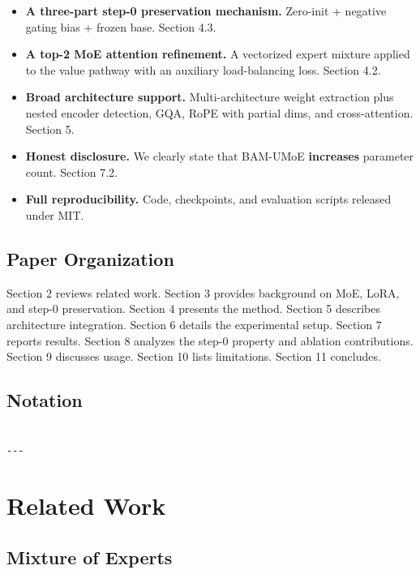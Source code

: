 \begin{itemize}
\item \textbf{A three-part step-0 preservation mechanism.} Zero-init + negative
  gating bias + frozen base. Section 4.3.
\item \textbf{A top-2 MoE attention refinement.} A vectorized expert mixture applied
  to the value pathway with an auxiliary load-balancing loss. Section 4.2.
\item \textbf{Broad architecture support.} Multi-architecture weight extraction plus
  nested encoder detection, GQA, RoPE with partial dims, and cross-attention.
  Section 5.
\item \textbf{Honest disclosure.} We clearly state that BAM-UMoE \textbf{increases}
  parameter count. Section 7.2.
\item \textbf{Full reproducibility.} Code, checkpoints, and evaluation scripts released
  under MIT.

\end{itemize}
\subsection{Paper Organization}

Section 2 reviews related work. Section 3 provides background on MoE, LoRA, 
and step-0 preservation. Section 4 presents the method. Section 5 describes 
architecture integration. Section 6 details the experimental setup. Section 7 
reports results. Section 8 analyzes the step-0 property and ablation 
contributions. Section 9 discusses usage. Section 10 lists limitations. 
Section 11 concludes.



\subsection{Notation}

\begin{lstlisting}

---
\end{lstlisting}

\section{Related Work}

\subsection{Mixture of Experts}

